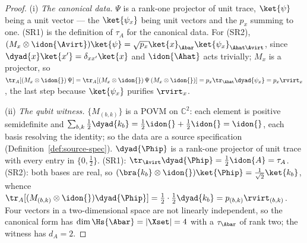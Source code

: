 \begin{proof}
(i) \emph{The canonical data.} $\Psi$ is a rank-one projector of unit
trace, $\ket{\psi}$ being a unit vector --- the $\ket{\psi_x}$ being unit
vectors and the $p_x$ summing to one. (SR1) is the definition of $\tau_A$
for the canonical data. For (SR2),
$(M_x\otimes\idon{\Avirt})\ket{\psi}
=\sqrt{p_x}\ket{x}_{\Abar}\ket{\psi_x}_{\Ahat\Avirt}$, since
$\dyad{x}\ket{x'}=\delta_{xx'}\ket{x}$ and $\idon{\Ahat}$ acts trivially;
$M_x$ is a projector, so
$\tr_A[(M_x\otimes\idon{})\,\Psi]
=\tr_A[(M_x\otimes\idon{})\,\Psi\,(M_x\otimes\idon{})]
=p_x\tr_{\Ahat}\dyad{\psi_x}=p_x\rvirt_x$, the last step because
$\ket{\psi_x}$ purifies $\rvirt_x$.

(ii) \emph{The qubit witness.} $\{M_{(b,k)}\}$ is a POVM on $\mathbb{C}^2$:
each element is positive semidefinite and
$\sum_{b,k}\tfrac12\dyad{k_b}=\tfrac12\idon{}+\tfrac12\idon{}=\idon{}$,
each basis resolving the identity; so the data are a source specification
(Definition~\ref{def:source-spec}). $\dyad{\Phip}$ is a rank-one projector
of unit trace with every entry in $\{0,\tfrac12\}$. (SR1):
$\tr_{\Avirt}\dyad{\Phip}=\tfrac12\idon{A}=\tau_A$. (SR2): both bases are
real, so $(\bra{k_b}\otimes\idon{})\ket{\Phip}=\tfrac1{\sqrt2}\ket{k_b}$,
whence $\tr_A[(M_{(b,k)}\otimes\idon{})\dyad{\Phip}]
=\tfrac12\cdot\tfrac12\dyad{k_b}=p_{(b,k)}\rvirt_{(b,k)}$. Four vectors
in a two-dimensional space are not linearly independent, so the canonical
form has $\dim\Hs{\Abar}=|\Xset|=4$ with a $\tau_{\Abar}$ of rank two; the
witness has $d_A=2$.
\end{proof}
